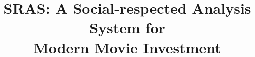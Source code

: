 \documentclass[sigconf]{acmart}
\begin{document}
\title[SRAS: A  Social-respected Analysis System for \\ Modern Movie Investment]{SRAS: A  Social-respected Analysis System for \\ Modern Movie Investment}

\maketitle











\end{document}
